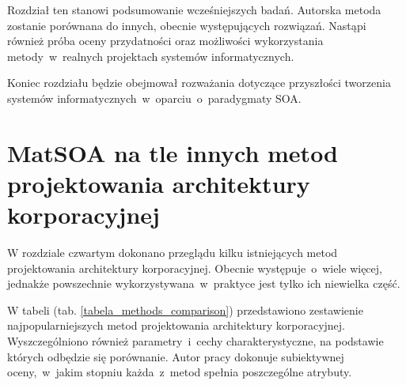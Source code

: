 Rozdział ten stanowi podsumowanie wcześniejszych badań. Autorska metoda zostanie porównana do innych, obecnie występujących rozwiązań. Nastąpi również próba oceny przydatności oraz możliwości wykorzystania metody~w~realnych projektach systemów informatycznych.

Koniec rozdziału będzie obejmował rozważania dotyczące przyszłości tworzenia systemów informatycznych~w~oparciu~o~paradygmaty SOA.

\section{MatSOA na tle innych metod projektowania architektury korporacyjnej}
W rozdziale czwartym dokonano przeglądu kilku istniejących metod projektowania architektury korporacyjnej. Obecnie występuje~o~wiele więcej, jednakże powszechnie wykorzystywana~w~praktyce jest tylko ich niewielka część.

W tabeli (tab. \ref{tabela_methods_comparison}) przedstawiono zestawienie najpopularniejszych metod projektowania architektury korporacyjnej. Wyszczególniono również parametry~i~cechy charakterystyczne, na podstawie których odbędzie się porównanie. Autor pracy dokonuje subiektywnej oceny,~w~jakim stopniu każda~z~metod spełnia poszczególne atrybuty.


